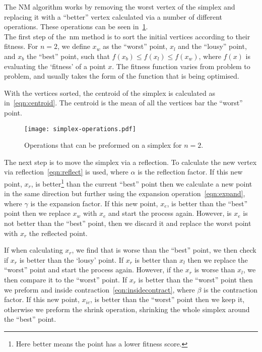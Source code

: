 The NM algorithm works by removing the worst vertex of the simplex and replacing it with a ``better'' vertex calculated via a number of different operations.
These operations can be seen in~\cref{fig:NM-operations}.\\

The first step of the~\gls*{nm} method is to sort the initial vertices according to their fitness.
For $n=2$, we define $x_w$ as the ``worst'' point, $x_l$ and the ``lousy'' point, and $x_b$ the ``best'' point, such that $f(x_b)\leq f(x_l)\leq f(x_w)$, where $f(x)$ is evaluating the `fitness' of a point $x$. 
The fitness function varies from problem to problem, and usually takes the form of the function that is being optimised.

With the vertices sorted, the centroid of the simplex is calculated as in~\cref{eqn:centroid}.
The centroid is the mean of all the vertices bar the ``worst'' point.

\begin{figure}[!htbp]
    \centering
    \texttt{[image: simplex-operations.pdf]}
    \caption{Operations that can be preformed on a simplex for $n=2$.}
    \label{fig:NM-operations}
\end{figure}

The next step is to move the simplex via a reflection.
To calculate the new vertex via reflection~\cref{eqn:reflect} is used, where $\alpha$ is the reflection factor.
If this new point, $x_r$, is better\footnote{Here better means the point has a lower fitness score.} than the current ``best'' point then we calculate a new point in the same direction but further using the expansion operation~\cref{eqn:expand}, where $\gamma$ is the expansion factor.
If this new point, $x_e$, is better than the ``best'' point then we replace $x_w$ with $x_e$ and start the process again.
However, is $x_e$ is not better than the ``best'' point, then we discard it and replace the worst point with $x_r$ the reflected point.

If when calculating $x_r$, we find that is worse than the ``best'' point, we then check if $x_r$ is better than the `lousy' point.
If $x_r$ is better than $x_l$ then we replace the ``worst'' point and start the process again.
However, if the $x_r$ is worse than $x_l$, we then compare it to the ``worst'' point.
If $x_r$ is better than the ``worst'' point then we preform and inside contraction~\cref{eqn:insidecontract}, where $\beta$ is the contraction factor.
If this new point, $x_{ic}$, is better than the ``worst'' point then we keep it, otherwise we preform the shrink operation, shrinking the whole simplex around the ``best'' point.

